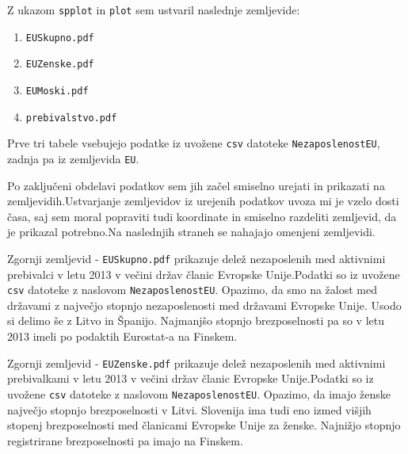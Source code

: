 \documentclass[11pt,a4paper]{article}
\begin{document}
Z ukazom \verb|spplot| in \verb|plot| sem ustvaril naslednje zemljevide: 
\begin{enumerate} 
\item{\verb|EUSkupno.pdf|}

\item{\verb|EUZenske.pdf|}

\item{\verb|EUMoski.pdf|}

\item{\verb|prebivalstvo.pdf|}
\end{enumerate}

Prve tri tabele vsebujejo podatke iz uvožene \verb|csv| datoteke \verb|NezaposlenostEU|, zadnja pa iz zemljevida \verb|EU|. 

Po zaključeni obdelavi podatkov sem jih začel smiselno urejati in prikazati na zemljevidih.Ustvarjanje zemljevidov iz urejenih podatkov uvoza mi je vzelo dosti časa, saj sem moral popraviti tudi koordinate in smiselno razdeliti zemljevid, da je prikazal potrebno.Na naslednjih straneh se nahajajo omenjeni zemljevidi. 


Zgornji zemljevid - \verb|EUSkupno.pdf| prikazuje delež nezaposlenih med aktivnimi prebivalci v letu 2013 v večini držav članic Evropske Unije.Podatki so iz uvožene \verb|csv| datoteke z naslovom \verb|NezaposlenostEU|. Opazimo, da smo na žalost med državami z največjo stopnjo nezaposlenosti med državami Evropske Unije. Usodo si delimo še z Litvo in Španijo. Najmanjšo stopnjo brezposelnosti pa so v letu 2013 imeli po podaktih Eurostat-a na Finskem.


Zgornji zemljevid - \verb|EUZenske.pdf| prikazuje delež nezaposlenih med aktivnimi prebivalkami v letu 2013 v večini držav članic Evropske Unije.Podatki so iz uvožene \verb|csv| datoteke z naslovom \verb|NezaposlenostEU|. Opazimo, da imajo ženske največjo stopnjo brezposelnosti v Litvi. Slovenija ima tudi eno izmed višjih stopenj brezposelnosti med članicami Evropske Unije za ženske. Najnižjo stopnjo registrirane brezposelnosti pa imajo na Finskem.

\end{document}
